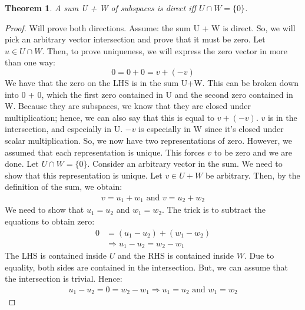 \documentclass[a4paper, 12pt]{article}
\newtheorem{theorem}{Theorem}
\theoremstyle{definition}
\theoremstyle{definition}
\theoremstyle{definition}
\theoremstyle{definition}
\begin{document}
{\begin{theorem}
	A sum U + W of subspaces is direct iff $U \cap W = \{0 \}$. 
\end{theorem}
\begin{proof}
	Will prove both directions.
	\newline
	[ $\Rightarrow$ ] Assume: the sum U + W is direct. So, we will pick an arbitrary vector intersection and prove that it must be zero. \newline 
	\newline 
	Let $u \in U \cap W$. Then, to prove uniqueness, we will express the zero vector in more than one way: 
	$$0 = 0 + 0 = v + (-v)$$
	We have that the zero on the LHS is in the sum U+W. This can be broken down into 0 + 0, which the first zero contained in U and the second zero contained in W. Because they are subspaces, we know that they are closed under multiplication; hence, we can also say that this is equal to $v + (-v)$. $v$ is in the intersection, and especially in U. $-v$ is especially in W since it's closed under scalar multiplication. 
	\newline
	\newline
	So, we now have two representations of zero. However, we assumed that each representation is unique. This forces $v$ to be zero and we are done. 
	\newline
	\newline
	[ $\Leftarrow$ ] Let $U \cap W = \{0 \} $. Consider an arbitrary vector in the sum. We need to show that this representation is unique. 
	\newline
	\newline 
	Let $v \in U + W$ be arbitrary. Then, by the definition of the sum, we obtain: 
	\begin{align*}
		v = u_1 + w_1 \mbox{    and    } v = u_2 + w_2 
	\end{align*}
	We need to show that $u_1 = u_2$ and $w_1 = w_2$. The trick is to subtract the equations to obtain zero: 
	\begin{align*}
		0 & = (u_1 - u_2) + (w_1 - w_2)  \\
		& \Rightarrow u_1 - u_2 = w_2 - w_1 
	\end{align*}
	The LHS is contained inside $U$ and the RHS is contained inside $W$. Due to equality, both sides are contained in the intersection. But, we can assume that the intersection is trivial. Hence: 
	\begin{align*}
		u_1 - u_2 = 0 = w_2 - w_1 \Rightarrow u_1 = u_2 \mbox{ and } w_1 = w_2 
	\end{align*}
	\end{proof}
}
\end{document}
